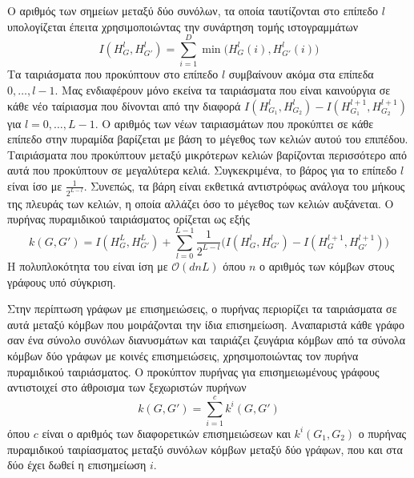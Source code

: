 Ο αριθμός των σημείων μεταξύ δύο συνόλων, τα οποία ταυτίζονται στο επίπεδο $l$ υπολογίζεται έπειτα χρησιμοποιώντας την συνάρτηση τομής ιστογραμμάτων
\begin{equation}
  I(H_G^l,H_{G'}^l) = \sum_{i=1}^D \min\big(H_G^l(i),H_{G'}^l(i)\big)
\end{equation}
Τα ταιριάσματα που προκύπτουν στο επίπεδο $l$ συμβαίνουν ακόμα στα επίπεδα $0, \ldots, l-1$.
Μας ενδιαφέρουν μόνο εκείνα τα ταιριάσματα που είναι καινούργια σε κάθε νέο ταίριασμα που δίνονται από την διαφορά $I(H_{G_1}^l,H_{G_2}^l) - I(H_{G_1}^{l+1},H_{G_2}^{l+1})$ για $l=0,\ldots,L-1$.
Ο αριθμός των νέων ταιριασμάτων που προκύπτει σε κάθε επίπεδο στην πυραμίδα βαρίζεται με βάση το μέγεθος των κελιών αυτού του επιπέδου.
Ταιριάσματα που προκύπτουν μεταξύ μικρότερων κελιών βαρίζονται περισσότερο από αυτά που προκύπτουν σε μεγαλύτερα κελιά.
Συγκεκριμένα, το βάρος για το επίπεδο $l$ είναι ίσο με $\frac{1}{2^{L-l}}$.
Συνεπώς, τα βάρη είναι εκθετικά αντιστρόφως ανάλογα του μήκους της πλευράς των κελιών, η οποία αλλάζει όσο το μέγεθος των κελιών αυξάνεται.
Ο πυρήνας πυραμιδικού ταιριάσματος ορίζεται ως εξής
\begin{equation}
  k(G,G') = I(H_G^L,H_{G'}^L) + \sum_{l=0}^{L-1} \frac{1}{2^{L-l}}\big(I(H_G^l,H_{G'}^l) - I(H_G^{l+1},H_{G'}^{l+1})\big)
\end{equation} 
Η πολυπλοκότητα του είναι ίση με $\mathcal{O}(dnL)$ όπου $n$ ο αριθμός των κόμβων στους γράφους υπό σύγκριση.

Στην περίπτωση γράφων με επισημειώσεις, ο πυρήνας περιορίζει τα ταιριάσματα σε αυτά μεταξύ κόμβων που μοιράζονται την ίδια επισημείωση.
Αναπαριστά κάθε γράφο σαν ένα σύνολο συνόλων διανυσμάτων και ταιριάζει ζευγάρια κόμβων από τα σύνολα κόμβων δύο γράφων με κοινές επισημειώσεις, χρησιμοποιώντας τον πυρήνα πυραμιδικού ταιριάσματος.
Ο προκύπτον πυρήνας για επισημειωμένους γράφους αντιστοιχεί στο άθροισμα των ξεχωριστών πυρήνων
\begin{equation}
    k(G, G') = \sum_{i=1}^c k^i(G,G')
\end{equation}
όπου $c$ είναι ο αριθμός των διαφορετικών επισημειώσεων και $k^i(G_1,G_2)$ ο πυρήνας πυραμιδικού ταιρίασματος μεταξύ συνόλων κόμβων μεταξύ δύο γράφων, που και στα δύο έχει δωθεί η επισημείωση $i$.


